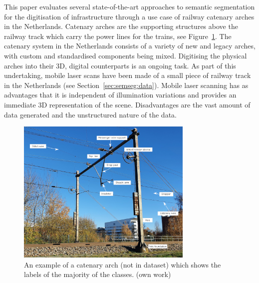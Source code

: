 This paper evaluates several state-of-the-art approaches to semantic segmentation for the digitisation of infrastructure through a use case of railway catenary arches in the Netherlands.
Catenary arches are the supporting structures above the railway track which carry the power lines for the trains, see Figure~\ref{fig:semseg:arch}.
The catenary system in the Netherlands consists of a variety of new and legacy arches, with custom and standardised components being mixed.
Digitising the physical arches into their 3D, digital counterparts is an ongoing task.
As part of this undertaking, mobile laser scans have been made of a small piece of railway track in the Netherlands (see Section~\ref{sec:semseg:data}). Mobile laser scanning has as advantages that it is independent of illumination variations and provides an immediate 3D representation of the scene. Disadvantages are the vast amount of data generated and the unstructured nature of the data.

\begin{figure}[t]
    \centering
    \includegraphics[width=0.75\textwidth]{./Chapters/semseg/figs/labels_catenary_arch.png}
    \caption{An example of a catenary arch (not in dataset) which shows the labels of the majority of the classes. (own work)}
    \label{fig:semseg:arch}
\end{figure}

